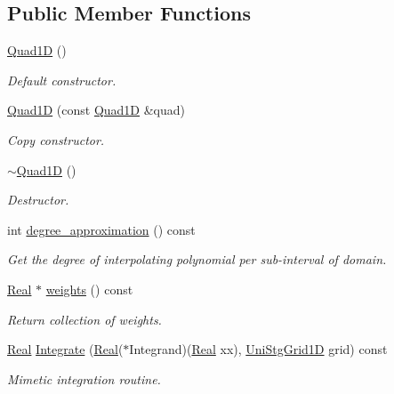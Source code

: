 \subsection*{Public Member Functions}
\begin{DoxyCompactItemize}
\item 
\hyperlink{classmtk_1_1Quad1D_ada5a2f1e7c92dbf1f85c61ecd0d173ec}{Quad1\+D} ()
\begin{DoxyCompactList}\small\item\em Default constructor. \end{DoxyCompactList}\item 
\hyperlink{classmtk_1_1Quad1D_ac4334daf0614bd4c789600c885b6116d}{Quad1\+D} (const \hyperlink{classmtk_1_1Quad1D}{Quad1\+D} \&quad)
\begin{DoxyCompactList}\small\item\em Copy constructor. \end{DoxyCompactList}\item 
\hyperlink{classmtk_1_1Quad1D_ae3de223d0841c9602feb4ea8b305a373}{$\sim$\+Quad1\+D} ()
\begin{DoxyCompactList}\small\item\em Destructor. \end{DoxyCompactList}\item 
int \hyperlink{classmtk_1_1Quad1D_aa1d1fe5f7cdaf8bf923a11c7d3d2468f}{degree\+\_\+approximation} () const 
\begin{DoxyCompactList}\small\item\em Get the degree of interpolating polynomial per sub-\/interval of domain. \end{DoxyCompactList}\item 
\hyperlink{group__c01-roots_gac080bbbf5cbb5502c9f00405f894857d}{Real} $\ast$ \hyperlink{classmtk_1_1Quad1D_aefd1ca6b381e1428b3d163ed650f79c4}{weights} () const 
\begin{DoxyCompactList}\small\item\em Return collection of weights. \end{DoxyCompactList}\item 
\hyperlink{group__c01-roots_gac080bbbf5cbb5502c9f00405f894857d}{Real} \hyperlink{classmtk_1_1Quad1D_a2d253b9ba8e05b06dc40a6a38bb0272d}{Integrate} (\hyperlink{group__c01-roots_gac080bbbf5cbb5502c9f00405f894857d}{Real}($\ast$Integrand)(\hyperlink{group__c01-roots_gac080bbbf5cbb5502c9f00405f894857d}{Real} xx), \hyperlink{classmtk_1_1UniStgGrid1D}{Uni\+Stg\+Grid1\+D} grid) const 
\begin{DoxyCompactList}\small\item\em Mimetic integration routine. \end{DoxyCompactList}\end{DoxyCompactItemize}
